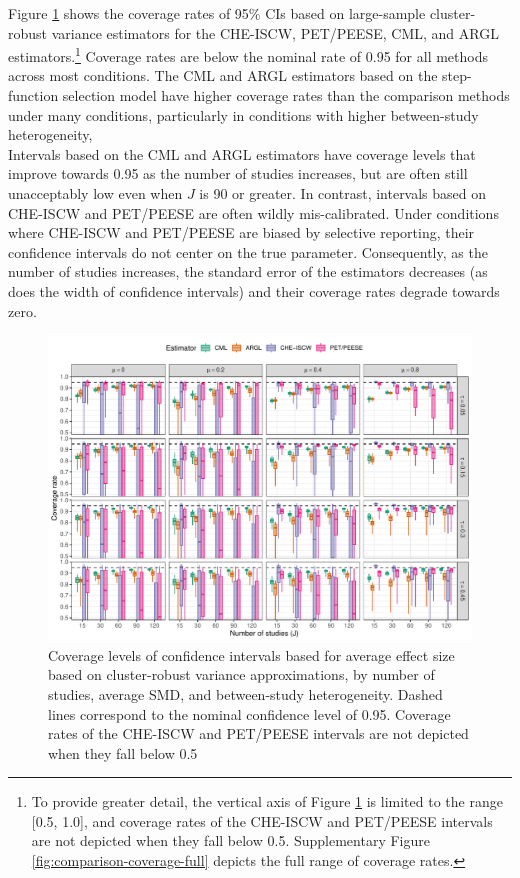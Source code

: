 \documentclass[
  man, donotrepeattitle,floatsintext]{apa7}
\begin{document}
Figure \ref{fig:comparison-coverage} shows the coverage rates of 95\% CIs based on large-sample cluster-robust variance estimators for the CHE-ISCW, PET/PEESE, CML, and ARGL estimators.\footnote{To provide greater detail, the vertical axis of Figure \ref{fig:comparison-coverage} is limited to the range {[}0.5, 1.0{]}, and coverage rates of the CHE-ISCW and PET/PEESE intervals are not depicted when they fall below 0.5. Supplementary Figure \ref{fig:comparison-coverage-full} depicts the full range of coverage rates.}
Coverage rates are below the nominal rate of 0.95 for all methods across most conditions.
The CML and ARGL estimators based on the step-function selection model have higher coverage rates than the comparison methods under many conditions, particularly in conditions with higher between-study heterogeneity,\\
Intervals based on the CML and ARGL estimators have coverage levels that improve towards 0.95 as the number of studies increases, but are often still unacceptably low even when \(J\) is 90 or greater.
In contrast, intervals based on CHE-ISCW and PET/PEESE are often wildly mis-calibrated.
Under conditions where CHE-ISCW and PET/PEESE are biased by selective reporting, their confidence intervals do not center on the true parameter. Consequently, as the number of studies increases, the standard error of the estimators decreases (as does the width of confidence intervals) and their coverage rates degrade towards zero.

\begin{figure}
\includegraphics{step-function-selection-models-with-dependent-effects_files/figure-latex/comparison-coverage-1} \caption{Coverage levels of confidence intervals based for average effect size based on cluster-robust variance approximations, by number of studies, average SMD, and between-study heterogeneity. Dashed lines correspond to the nominal confidence level of 0.95. Coverage rates of the CHE-ISCW and PET/PEESE intervals are not depicted when they fall below 0.5}\label{fig:comparison-coverage}
\end{figure}
\end{document}
